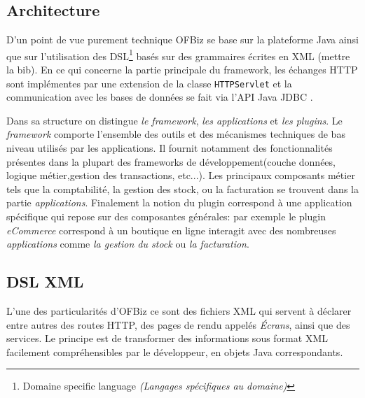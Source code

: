 \subsection{Architecture }
D'un point de vue purement technique OFBiz se base sur la plateforme Java ainsi que sur l'utilisation des DSL\footnote{Domaine specific language \emph{(Langages spécifiques au domaine)}} basés sur des grammaires écrites en XML (mettre la bib). En ce qui concerne la partie principale du framework, les échanges HTTP sont implémentes par une extension de la classe \verb=HTTPServlet= \cite{chan2017servlet} et la communication avec les bases de données se fait via l'API Java JDBC \cite{JDBC}.

Dans sa structure on distingue \emph{le framework}, \emph{les applications} et \emph{les plugins}. Le \emph{framework} comporte l'ensemble des outils et des mécanismes techniques de bas niveau utilisés par les applications. Il fournit notamment des fonctionnalités présentes dans la plupart des frameworks de développement(couche données, logique métier,gestion des transactions, etc...).
Les principaux composants métier tels que la comptabilité, la gestion des stock, ou la facturation se trouvent dans la partie \emph{applications}. 
Finalement la notion du plugin  correspond à une application spécifique qui repose sur des composantes générales: par exemple le plugin \emph{eCommerce} correspond à un boutique en ligne interagit avec des nombreuses  \emph{applications} comme \emph{la gestion du stock} ou \emph{la facturation}. 

\subsection{DSL XML}
L'une des particularités d'OFBiz ce sont des fichiers XML qui servent à déclarer entre autres
des routes HTTP, des pages de rendu appelés \emph{Écrans}, ainsi que des services. Le principe est de transformer des informations sous format XML facilement compréhensibles par le développeur, en objets Java correspondants. 


